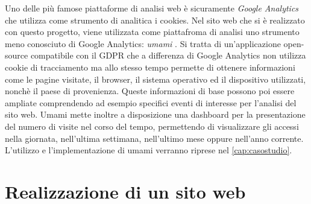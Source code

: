 \documentclass[target=bach,aauheader=]{thud}
\begin{document}
Uno delle più famose piattaforme di analisi web è sicuramente \textit{Google Analytics} che utilizza come strumento di analitica i cookies. 
Nel sito web che si è realizzato con questo progetto, viene utilizzata come piattafroma di analisi uno strumento meno conosciuto di Google Analytics: \textit{umami} \cite{umami-site}. 
Si tratta di un'applicazione open-source compatibile con il GDPR che a differenza di Google Analytics non utilizza cookie di tracciamento ma allo stesso tempo permette di ottenere informazioni come le pagine visitate, il browser, il sistema operativo ed il dispositivo utilizzati, nonchè il paese di provenienza. Queste informazioni di base possono poi essere ampliate comprendendo ad esempio specifici eventi di interesse per l'analisi del sito web.
Umami mette inoltre a disposizione una dashboard per la presentazione del numero di visite nel corso del tempo, permettendo di visualizzare gli accessi nella giornata, nell'ultima settimana, nell'ultimo mese oppure nell'anno corrente. 
\newline 
L'utilizzo e l'implementazione di umami verranno riprese nel \cref{cap:casostudio}.


\chapter{Realizzazione di un sito web}

\end{document}
